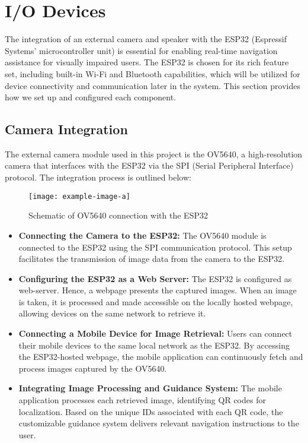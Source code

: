 
\section{I/O Devices}

The integration of an external camera and speaker with the ESP32 (Espressif Systems' microcontroller unit) is essential for enabling real-time navigation assistance for visually impaired users. The ESP32 is chosen for its rich feature set, including built-in Wi-Fi and Bluetooth capabilities, which will be utilized for device connectivity and communication later in the system. This section provides how we set up and configured each component. 

\subsection{Camera Integration}

The external camera module used in this project is the OV5640, a high-resolution camera that interfaces with the ESP32 via the SPI (Serial Peripheral Interface) protocol. The integration process is outlined below:

\begin{figure}[h!]
	\centering
	\texttt{[image: example-image-a]}
	\caption{Schematic of OV5640 connection with the ESP32}
	\label{fig:camera_schematics}
\end{figure}

\begin{itemize}
	\item \textbf{Connecting the Camera to the ESP32:} The OV5640 module is connected to the ESP32 using the SPI communication protocol. This setup facilitates the transmission of image data from the camera to the ESP32. 
	
	\item \textbf{Configuring the ESP32 as a Web Server:} The ESP32 is configured as web-server. Hence, a webpage  presents the captured images. When an image is taken, it is processed and made accessible on the locally hosted webpage, allowing devices on the same network to retrieve it.
	
	\item \textbf{Connecting a Mobile Device for Image Retrieval:} Users can connect their mobile devices to the same local network as the ESP32. By accessing the ESP32-hosted webpage, the mobile application can continuously fetch and process images captured by the OV5640.
	
	\item \textbf{Integrating Image Processing and Guidance System:} The mobile application processes each retrieved image, identifying QR codes for localization. Based on the unique IDs associated with each QR code, the customizable guidance system delivers relevant navigation instructions to the user.
\end{itemize}


